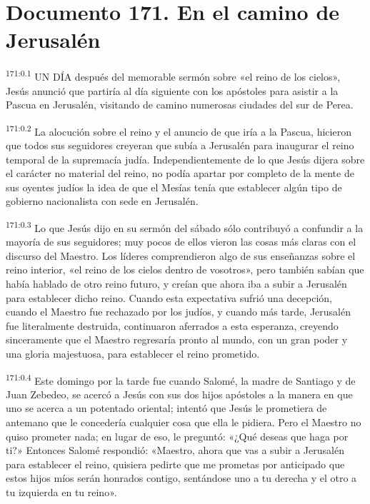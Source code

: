 \chapter{Documento 171. En el camino de Jerusalén}
\par 
\textsuperscript{171:0.1} UN DÍA después del memorable sermón sobre «el reino de los cielos», Jesús anunció que partiría al día siguiente con los apóstoles para asistir a la Pascua en Jerusalén, visitando de camino numerosas ciudades del sur de Perea.

\par 
\textsuperscript{171:0.2} La alocución sobre el reino y el anuncio de que iría a la Pascua, hicieron que todos sus seguidores creyeran que subía a Jerusalén para inaugurar el reino temporal de la supremacía judía. Independientemente de lo que Jesús dijera sobre el carácter no material del reino, no podía apartar por completo de la mente de sus oyentes judíos la idea de que el Mesías tenía que establecer algún tipo de gobierno nacionalista con sede en Jerusalén.

\par 
\textsuperscript{171:0.3} Lo que Jesús dijo en su sermón del sábado sólo contribuyó a confundir a la mayoría de sus seguidores; muy pocos de ellos vieron las cosas más claras con el discurso del Maestro. Los líderes comprendieron algo de sus enseñanzas sobre el reino interior, «el reino de los cielos dentro de vosotros», pero también sabían que había hablado de otro reino futuro, y creían que ahora iba a subir a Jerusalén para establecer dicho reino. Cuando esta expectativa sufrió una decepción, cuando el Maestro fue rechazado por los judíos, y cuando más tarde, Jerusalén fue literalmente destruida, continuaron aferrados a esta esperanza, creyendo sinceramente que el Maestro regresaría pronto al mundo, con un gran poder y una gloria majestuosa, para establecer el reino prometido.

\par 
\textsuperscript{171:0.4} Este domingo por la tarde fue cuando Salomé, la madre de Santiago y de Juan Zebedeo, se acercó a Jesús con sus dos hijos apóstoles a la manera en que uno se acerca a un potentado oriental; intentó que Jesús le prometiera de antemano que le concedería cualquier cosa que ella le pidiera. Pero el Maestro no quiso prometer nada; en lugar de eso, le preguntó: «¿Qué deseas que haga por ti?» Entonces Salomé respondió: «Maestro, ahora que vas a subir a Jerusalén para establecer el reino, quisiera pedirte que me prometas por anticipado que estos hijos míos serán honrados contigo, sentándose uno a tu derecha y el otro a tu izquierda en tu reino».

